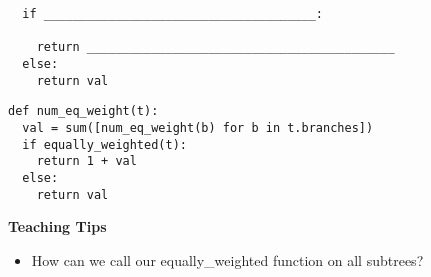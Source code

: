 \begin{parts}
\begin{lstlisting}
  if ______________________________________:

    return ___________________________________________
  else:
    return val
\end{lstlisting}

\begin{solution}
\begin{lstlisting}
def num_eq_weight(t):
  val = sum([num_eq_weight(b) for b in t.branches])
  if equally_weighted(t):
    return 1 + val
  else:
    return val
\end{lstlisting}
\end{solution}
\begin{guide}
\textbf{Teaching Tips}
  \begin{itemize}
    \item How can we call our equally\_weighted function on all subtrees?
  \end{itemize}
\end{guide}
\end{parts}